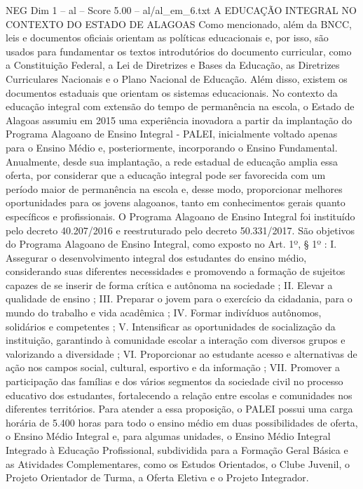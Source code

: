 \begin{textsample}{NEG Dim 1 – al – Score 5.00 – al/al\_em\_6.txt}  \label{ex:f1_neg_137}
A EDUCAÇÃO INTEGRAL NO CONTEXTO DO ESTADO DE ALAGOAS Como mencionado, além da BNCC, leis e documentos oficiais orientam as políticas educacionais e, por isso, são usados para fundamentar os textos introdutórios do documento curricular, como a Constituição Federal, a Lei de Diretrizes e Bases da Educação, as Diretrizes Curriculares Nacionais e o Plano Nacional de Educação.
Além disso, existem os documentos estaduais que orientam os sistemas educacionais.
No contexto da educação integral com extensão do tempo de permanência na escola, o Estado de Alagoas assumiu em 2015 uma experiência inovadora a partir da implantação do Programa Alagoano de Ensino Integral - PALEI, inicialmente voltado apenas para o Ensino Médio e, posteriormente, incorporando o Ensino Fundamental.
Anualmente, desde sua implantação, a rede estadual de educação amplia essa oferta, por considerar que a educação integral pode ser favorecida com um período maior de permanência na escola e, desse modo, proporcionar melhores oportunidades para os jovens alagoanos, tanto em conhecimentos gerais quanto específicos e profissionais.
O Programa Alagoano de Ensino Integral foi instituído pelo decreto 40.207/2016 e reestruturado pelo decreto 50.331/2017.
São objetivos do Programa Alagoano de Ensino Integral, como exposto no Art. 1º, § 1º : I.
Assegurar o desenvolvimento integral dos estudantes do ensino médio, considerando suas diferentes necessidades e promovendo a formação de sujeitos capazes de se inserir de forma crítica e autônoma na sociedade ; II.
Elevar a qualidade de ensino ; III.
Preparar o jovem para o exercício da cidadania, para o mundo do trabalho e vida acadêmica ; IV.
Formar indivíduos autônomos, solidários e competentes ; V.
Intensificar as oportunidades de socialização da instituição, garantindo à comunidade escolar a interação com diversos grupos e valorizando a diversidade ; VI.
Proporcionar ao estudante acesso e alternativas de ação nos campos social, cultural, esportivo e da informação ; VII.
Promover a participação das famílias e dos vários segmentos da sociedade civil no processo educativo dos estudantes, fortalecendo a relação entre escolas e comunidades nos diferentes territórios.
Para atender a essa proposição, o PALEI possui uma carga horária de 5.400 horas para todo o ensino médio em duas possibilidades de oferta, o Ensino Médio Integral e, para algumas unidades, o Ensino Médio Integral Integrado à Educação Profissional, subdividida para a Formação Geral Básica e as Atividades Complementares, como os Estudos Orientados, o Clube Juvenil, o Projeto Orientador de Turma, a Oferta Eletiva e o Projeto Integrador.

\end{textsample}
